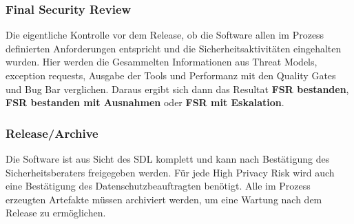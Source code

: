 \subsubsection{Final Security Review}
Die eigentliche Kontrolle vor dem Release, ob die Software allen im Prozess definierten Anforderungen entspricht und die Sicherheitsaktivitäten eingehalten wurden. Hier werden die Gesammelten Informationen aus Threat Models, exception requests, Ausgabe der Tools und Performanz mit den Quality Gates und Bug Bar verglichen. Daraus ergibt sich dann das Resultat \textbf{FSR bestanden}, \textbf{FSR bestanden mit Ausnahmen} oder \textbf{FSR mit Eskalation}.

\subsubsection{Release/Archive}
Die Software ist aus Sicht des SDL komplett und kann nach Bestätigung des Sicherheitsberaters freigegeben werden. Für jede High Privacy Risk wird auch eine Bestätigung des Datenschutzbeauftragten benötigt.
Alle im Prozess erzeugten Artefakte müssen archiviert werden, um eine Wartung nach dem Release zu ermöglichen.